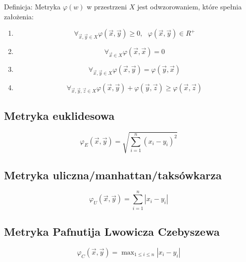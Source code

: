 \documentclass[a4paper,10pt]{article}
\begin{document}
Definicja:
Metryka $\varphi(w)$ w przestrzeni $X$ jest odwzorowaniem, które spełnia założenia:
\begin{enumerate}
 \item \begin{equation}
         \mathop{\forall}_{\overrightarrow{x}, \overrightarrow{y} \in X} \varphi(\overrightarrow{x}, \overrightarrow{y}) \geq 0, \; \, \: \varphi(\overrightarrow{x}, \overrightarrow{y}) \in R^{+}
       \end{equation}
 \item \begin{equation}
         \mathop{\forall}_{\overrightarrow{x} \in X} \varphi(\overrightarrow{x}, \overrightarrow{x}) = 0
       \end{equation}
 \item \begin{equation}
         \mathop{\forall}_{\overrightarrow{x}, \overrightarrow{y} \in X} \varphi(\overrightarrow{x}, \overrightarrow{y})  = \varphi(\overrightarrow{y}, \overrightarrow{x})
       \end{equation}
 \item \begin{equation}
         \mathop{\forall}_{\overrightarrow{x}, \overrightarrow{y}, \overrightarrow{z} \in X} \varphi(\overrightarrow{x}, \overrightarrow{y})  + \varphi(\overrightarrow{y}, \overrightarrow{z}) \geq \varphi(\overrightarrow{x}, \overrightarrow{z})
       \end{equation}
\end{enumerate}
\subsection{Metryka euklidesowa}
\begin{equation}
  \varphi_E(\overrightarrow{x}, \overrightarrow{y}) = \sqrt{\sum_{i = 1}^n (x_i - y_i)^2}
\end{equation}
\subsection{Metryka uliczna/manhattan/taksówkarza}
\begin{equation}
  \varphi_U(\overrightarrow{x}, \overrightarrow{y}) = \sum_{i = 1}^n |x_i - y_i|
\end{equation}
\subsection{Metryka Pafnutija Lwowicza Czebyszewa}
\begin{equation}
  \varphi_C(\overrightarrow{x}, \overrightarrow{y}) = \mathop{\mbox{max}}_{1 \leq i \leq n} |x_i - y_i|
\end{equation}
\end{document}
